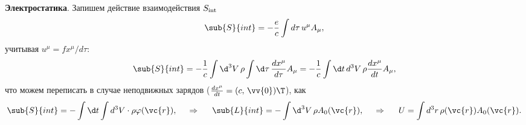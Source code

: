 \textbf{Электростатика}. Запишем действие взаимодействия $S_{\textnormal{int}}$
\begin{equation*}
    \sub{S}{int} = - \frac{e}{c} \int d \tau\, u^\mu A_\mu,
\end{equation*}
учитывая $u^\mu = f x^\mu / d \tau$:
\begin{equation*}
    \sub{S}{int} = - \frac{1}{c} \int \d^3 V\, \rho \int \d \tau\, \frac{d x^\mu}{d \tau}  A_\mu = 
    - \frac{1}{c} \int \d t\, d^3 V\, \rho \frac{d x^\mu}{d t}  A_\mu,
\end{equation*}
что можем переписать в случае неподвижных зарядов ($\frac{d x^\mu}{d t} = (c,\, \vv{0})\T$), как
\begin{equation*}
    \sub{S}{int} = - \int \d t \int d^3 V \cdot \rho \varphi(\vc{r}),
    \hspace{0.5cm} \Rightarrow \hspace{0.5cm}
    \sub{L}{int} = - \int \d^3 V\, \rho A_0(\vc{r}),
    \hspace{0.5cm} \Rightarrow \hspace{0.5cm}
    U = \int d^3 r\, \rho(\vc{r}) A_0 (\vc{r}).
\end{equation*}